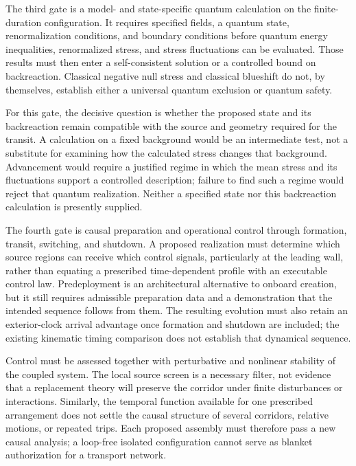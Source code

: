 \documentclass[11pt]{article}
\begin{document}
The third gate is a model- and state-specific quantum calculation on the finite-duration configuration. It requires specified fields, a quantum state, renormalization conditions, and boundary conditions before quantum energy inequalities, renormalized stress, and stress fluctuations can be evaluated. Those results must then enter a self-consistent solution or a controlled bound on backreaction. Classical negative null stress and classical blueshift do not, by themselves, establish either a universal quantum exclusion or quantum safety.

For this gate, the decisive question is whether the proposed state and its backreaction remain compatible with the source and geometry required for the transit. A calculation on a fixed background would be an intermediate test, not a substitute for examining how the calculated stress changes that background. Advancement would require a justified regime in which the mean stress and its fluctuations support a controlled description; failure to find such a regime would reject that quantum realization. Neither a specified state nor this backreaction calculation is presently supplied.

The fourth gate is causal preparation and operational control through formation, transit, switching, and shutdown. A proposed realization must determine which source regions can receive which control signals, particularly at the leading wall, rather than equating a prescribed time-dependent profile with an executable control law. Predeployment is an architectural alternative to onboard creation, but it still requires admissible preparation data and a demonstration that the intended sequence follows from them. The resulting evolution must also retain an exterior-clock arrival advantage once formation and shutdown are included; the existing kinematic timing comparison does not establish that dynamical sequence.

Control must be assessed together with perturbative and nonlinear stability of the coupled system. The local source screen is a necessary filter, not evidence that a replacement theory will preserve the corridor under finite disturbances or interactions. Similarly, the temporal function available for one prescribed arrangement does not settle the causal structure of several corridors, relative motions, or repeated trips. Each proposed assembly must therefore pass a new causal analysis; a loop-free isolated configuration cannot serve as blanket authorization for a transport network.
\end{document}
